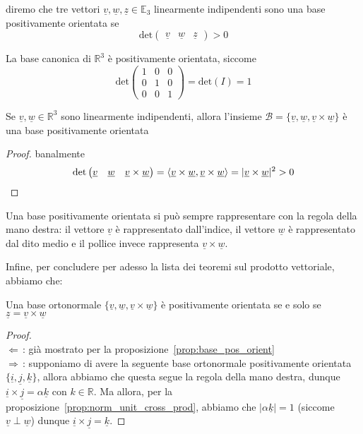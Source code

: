\begin{definition}
diremo che tre vettori $\underline{v}, \underline{w}, \underline{z} \in \mathbb{E}_3$ linearmente indipendenti sono una base positivamente orientata se
$$
\text{det}\begin{pmatrix}
	\underline{v} & \underline{w} & \underline{z}
\end{pmatrix} > 0
$$
\end{definition}
\begin{remark}
La base canonica di $\mathbb{R}^3$ è positivamente orientata, siccome
$$
\text{det}\begin{pmatrix}
	1 & 0 & 0 \\
	0 & 1 & 0 \\
	0 & 0 & 1
\end{pmatrix} = \text{det}(I) = 1
$$
\end{remark}
\begin{prop}
	Se $\underline{v}, \underline{w} \in \mathbb{R}^3$ sono linearmente indipendenti, allora l'insieme $\mathcal{B} = \{\underline{v}, \underline{w}, \underline{v} \times \underline{w} \}$ è una base positivamente orientata
\label{prop:base_pos_orient}
\end{prop}
\begin{proof}
banalmente
$$
\text{det}\begin{pmatrix}
	\underline{v} & \underline{w} & \underline{v} \times \underline{w} \end{pmatrix} = \langle \underline{v} \times \underline{w}, \underline{v} \times \underline{w} \rangle = |\underline{v} \times \underline{w}|^2 >  0
$$
\end{proof}
\begin{remark}
Una base positivamente orientata si può sempre rappresentare con la regola della mano destra: il vettore $\underline{v}$ è rappresentato dall'indice, il vettore $\underline{w}$ è rappresentato dal dito medio e il pollice invece rappresenta $\underline{v} \times \underline{w}$.
\end{remark}
\noindent Infine, per concludere per adesso la lista dei teoremi sul prodotto vettoriale, abbiamo che:
\begin{prop}
Una base ortonormale $\{ \underline{v} , \underline{w} , \underline{v} \times \underline{w} \}$ è positivamente orientata se e solo se $\underline{z} = \underline{v} \times \underline{w}$
\end{prop}
\begin{proof} \hfill \\
$\boxed{\Leftarrow} \,$: già mostrato per la proposizione~\ref{prop:base_pos_orient} \\
$\boxed{\Rightarrow} \,$: supponiamo di avere la seguente base ortonormale positivamente orientata $\{\underline{i}, \underline{j}, \underline{k} \}$, allora abbiamo che questa segue la regola della mano destra, dunque $\underline{i} \times \underline{j} = \alpha \underline{k}$ con $k \in \mathbb{R}$. Ma allora, per la proposizione~\ref{prop:norm_unit_cross_prod}, abbiamo che $|\alpha \underline{k}|=1$ (siccome $\underline{v} \perp \underline{w}$) dunque $\underline{i} \times \underline{j} = \underline{k}$. 	
\end{proof}
